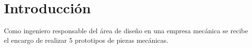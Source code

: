 \vspace*{\fill}

\section{Introducción}

  Como ingeniero responsable del área de diseño en una empresa mecánica se recibe el encargo de realizar 5 prototipos de piezas mecánicas.

\vspace*{\fill}